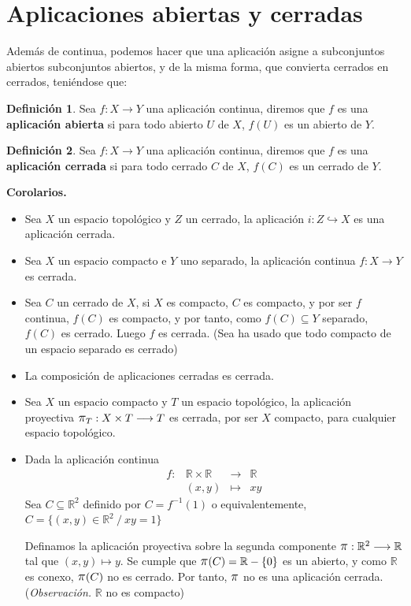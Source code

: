 \documentclass[12pt,twoside]{report}
\theoremstyle{azul}
\theoremstyle{azul2}
\theoremstyle{plain}
\theoremstyle{definition}
\newtheorem*{defi}{Definición}
\theoremstyle{remark}
\begin{document}
\section{Aplicaciones abiertas y cerradas}
Además de continua, podemos hacer que una aplicación asigne a subconjuntos abiertos subconjuntos abiertos, y de la misma forma, que convierta cerrados en cerrados, teniéndose que:
\begin{defi} Sea $f: X \longrightarrow Y$ una aplicación continua, 
 diremos que $f$ es una \textbf{aplicación abierta} si para todo abierto $U$ de $X$, $f(U)$ es un abierto de $Y$. 
\end{defi}
\begin{defi} Sea $f: X \longrightarrow Y$ una aplicación continua, 
 diremos que $f$ es una \textbf{aplicación cerrada} si para todo cerrado $C$ de $X$, $f(C)$ es un cerrado de $Y$. 
\end{defi}
\hspace{-7mm}\textbf{Corolarios.}
\vspace{-5mm}
\begin{itemize}
    \item Sea $X$ un espacio topológico y $Z$ un cerrado, la aplicación $i: Z \hookrightarrow X$ es una aplicación cerrada. 
    \item Sea $X$ un espacio compacto e $Y$ uno separado, la aplicación continua $f: X \longrightarrow Y$ es cerrada. 
    \item Sea $C$ un cerrado de $X$, si $X$ es compacto, $C$ es compacto, y por ser $f$ continua, $f(C)$ es compacto, y por tanto, como $f(C) \subseteq Y$ separado, $f(C)$ es cerrado. Luego $f$ es cerrada. (Sea ha usado que todo compacto de un espacio separado es cerrado)  
    \item La composición de aplicaciones cerradas es cerrada. 
    \item Sea $X$ un espacio compacto y $T$ un espacio topológico, la aplicación proyectiva $\mathlarger{\mathlarger{\pi}}_T : X \times T \longrightarrow T$ es cerrada, por ser $X$ compacto, para cualquier espacio topológico. 
    \item Dada la aplicación continua
    $$\begin{array}{rrcl}
         f : & \mathbb{R} \times \mathbb{R} & \longrightarrow & \mathbb{R}  \\
        \;  & (x,y) & \longmapsto & xy
    \end{array}$$
    Sea $C \subseteq \mathbb{R}^2$ definido por $C=f^{-1}(1)$ o equivalentemente, $C=\{(x,y) \in \mathbb{R}^2 \: / \: xy=1\}$
    
    Definamos la aplicación proyectiva sobre la segunda componente $\mathlarger{\mathlarger{\pi}}: \mathbb{R}^2 \longrightarrow \mathbb{R}$ tal que $(x,y) \longmapsto y$. Se cumple que $\mathlarger{\mathlarger{\pi}}(C) = \mathbb{R}-\{0\}$ es un abierto, y como $\mathbb{R}$ es conexo, $\mathlarger{\mathlarger{\pi}}(C)$ no es cerrado. Por tanto, $\mathlarger{\mathlarger{\pi}}$ no es una aplicación cerrada. (\textit{Observación. }$\mathbb{R}$ no es compacto)
\end{itemize}
\end{document}

